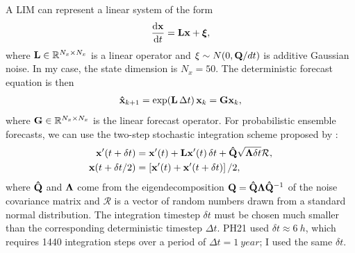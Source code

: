 \documentclass[parskip=half,DIV=16]{scrartcl}
\begin{document}
A \gls{LIM} can represent a linear system of the form
\begin{align*}
    \dv{\vb{x}}{t} = \vb{L}\vb{x} + \vb*{\xi},
\end{align*}
where $\vb{L} \in \mathbb{R}^{N_x \times N_x}$ is a linear operator and $\xi \sim N(0, \vb{Q}/dt)$ is additive Gaussian noise. In my case, the state dimension is $N_x = 50$. The deterministic forecast equation is then~\parencite{Penland1995}
\begin{align*}
    \vu{x}_{k+1} = \exp (\vb{L} \, \Delta t) \, \vb{x}_k  = \vb{G} \vb{x}_k ,
\end{align*}
where $\vb{G} \in \mathbb{R}^{N_x \times N_x}$ is the linear forecast operator. For probabilistic ensemble forecasts, we can use the two-step stochastic integration scheme proposed by \textcite{Penland1994}:
\begin{align}
    \label{eq:stoch-forecast}
    \vb{x'}(t+\delta t) &= \vb{x'}(t) + \vb{L}\vb{x'}(t) \, \delta t + \vu{Q} \sqrt{\vb{\Lambda}\delta t} \mathcal{R},
    \\
    \vb{x}(t + \delta t / 2) &= \left[\vb{x'}(t) + \vb{x'}(t+\delta t)\right] / 2,
\end{align}
where $\vu{Q}$ and $\vb{\Lambda}$ come from the eigendecomposition $\vb{Q} = \vu{Q} \vb{\Lambda}\vu{Q}^{-1}$ of the noise covariance matrix and $\mathcal{R}$ is a vector of random numbers drawn from a standard normal distribution. The integration timestep $\delta t$ must be chosen much smaller than the corresponding deterministic timestep $\Delta t$. PH21 used $\delta t \approx \qty{6}{h}$, which requires 1440 integration steps over a period of $\Delta t = \qty{1}{year}$; I used the same $\delta t$.
\end{document}
